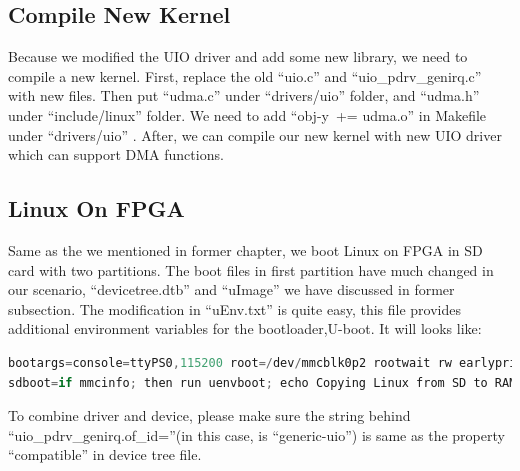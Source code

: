 \subsection{Compile New Kernel}
\label{subsec:Compile New Kernel}
Because we modified the UIO driver and add some new library, we need to compile a new kernel. First, replace the old ``uio.c'' and ``uio\_pdrv\_genirq.c'' with new files. Then put ``udma.c'' under ``drivers/uio'' folder, and ``udma.h'' under ``include/linux'' folder. We need to add ``obj-y\  += udma.o'' in Makefile under ``drivers/uio'' . After, we can compile our new kernel with new UIO driver which can support DMA functions.

\subsection{Linux On FPGA}
\label{subsec:Linux On FPGA}
Same as the we mentioned in former chapter, we boot Linux on FPGA in SD card with two partitions. The boot files in first partition have much changed in our scenario, ``devicetree.dtb'' and ``uImage'' we have discussed in former subsection. The modification in ``uEnv.txt'' is quite easy, this file provides additional environment variables for the bootloader,U-boot. It will looks like: 
\begin{lstlisting}[frame=single,language=C]
bootargs=console=ttyPS0,115200 root=/dev/mmcblk0p2 rootwait rw earlyprintk uio_pdrv_genirq.of_id=genric-uio
sdboot=if mmcinfo; then run uenvboot; echo Copying Linux from SD to RAM... && load mmc 0 ${kernel_load_address} ${kernel_image} && load mmc 0 ${devicetree_load_address} ${devicetree_image} && load mmc 0 ${ramdisk_load_address} ${ramdisk_image} && bootm ${kernel_load_address} - ${devicetree_load_address}; fi
\end{lstlisting}
To combine driver and device, please make sure the string behind ``uio\_pdrv\_genirq.of\_id=''(in this case, is ``generic-uio'') is same as the property ``compatible'' in device tree file.

